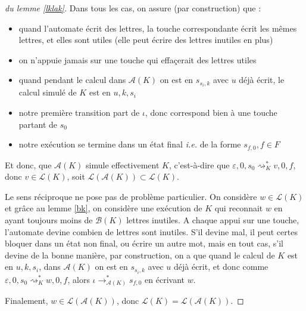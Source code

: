 \documentclass[12pt, a4paper]{article}
\renewcommand{\L}{\mathcal{L}}
\newcommand{\A}{\mathcal{A}}
\begin{document}
\begin{proof}[du lemme \ref{lklak}]
       Dans tous les cas, on assure (par construction) que :
       \begin{itemize}
        \item quand l'automate écrit des lettres, la touche correspondante écrit les mêmes lettres, et elles sont utiles (elle peut écrire des lettres inutiles en plus)
        \item on n'appuie jamais sur une touche qui effaçerait des lettres utiles 
        \item quand pendant le calcul dans $\A(K)$ on est en $s_{s_i,k}$ avec $u$ déjà écrit, le calcul simulé de $K$ est en $u,k,s_i$
        \item notre première transition part de $\iota$, donc correspond bien à une touche partant de $s_0$ 
        \item notre exécution se termine dans un état final \textit{i.e.} de la forme $s_{f,0}, f \in F$
       \end{itemize} 
       Et donc, que $\A(K)$ simule effectivement $K$, c'est-à-dire que $\varepsilon,0,s_0 \rightsquigarrow^*_K v,0,f$, donc $v \in \L(K)$, soit $\L(\A(K)) \subset \L(K)$.

       Le sens réciproque ne pose pas de problème particulier. On considère $w \in \L(K)$ et grâce au lemme \ref{bk}, on considère une exécution de $K$ qui reconnait $w$ en ayant toujours moins de $\mathcal{B}(K)$ lettres inutiles.
       A chaque appui sur une touche, l'automate devine combien de lettres sont inutiles. 
       S'il devine mal, il peut certes bloquer dans un état non final, ou écrire un autre mot, mais en tout cas, s'il devine de la bonne manière, par construction, on a que quand le calcul de $K$ est en $u,k,s_i$, dans $\A(K)$ on est en $s_{s_i,k}$ avec $u$ déjà écrit, et donc comme $\varepsilon,0,s_0 \rightsquigarrow^*_K w,0,f$, alors $\iota \rightarrow^*_{\A(K)} s_{f,0}$ en écrivant $w$. 
       
       Finalement, $w \in \L(\A(K))$, donc $\L(K) = \L(\A(K))$.
    \end{proof}

    \clearpage
    \printbibliography
\end{document}
